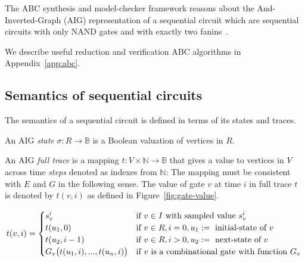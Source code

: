 The ABC synthesis and model-checker framework reasons about 
the And-Inverted-Graph (AIG) representation of a sequential 
circuit which are sequential circuits with only NAND gates and 
with exactly two fanins~\cite{brayton2010abc}. 

We describe useful reduction
and verification ABC algorithms in Appendix~\ref{app:abc}. 


\subsection{Semantics of sequential circuits}
\label{s:back:crct_semantics}
%
The semantics of a sequential circuit is defined in terms of its states and traces.
%
\begin{definition}
An AIG \emph{state} $\sigma: R \rightarrow \mathbb{B}$ is a Boolean valuation of vertices in $R$. 
\end{definition}
%


\begin{definition}
An AIG {\em full trace} is a mapping 
$t: V \times \mathbb{N} \rightarrow
\mathbb{B}$ that gives a value to vertices in
$V$ across time {\em steps} denoted as indexes from
$\mathbb{N}$:
The mapping must be consistent with $E$ and
$G$ in the following sense.
The value of gate $v$ at time $i$ in
full trace $t$ is denoted by $t(v,i)$ as defined in 
Figure~\ref{fig:gate-value}.
\end{definition}


%
\begin{figure*}
\[
t(v,i)=
   \begin{cases}
      s^i_{v}            & \text{if } v \in I \ \text{with sampled value $s_{v}^i$}\\
      t(u_1, 0)       & \text{if } v \in R,i=0,u_1:=\ \text{initial-state of $v$}\\
      t(u_2, i-1)        & \text{if } v \in R,i>0,u_2:=\ \text{next-state of $v$}\\
      G_v\big(t(u_{1},i),...,t(u_{n},i)\big) & \text{if } v \ \text{is a combinational gate with function $G_v$}
   \end{cases} \newline
\]
\caption{Semantics of sequential circuits given in terms of 
  full traces. $t(v,i)$ denotes the valuation of gate $v$ at step $i$ in trace $t$.
Term $u_{j}$ denotes the source vertex of the $j$-th incoming edge to $v$, that is, %
$(u_{j},v)\in E$.
  }
\label{fig:gate-value}
\end{figure*}
%


